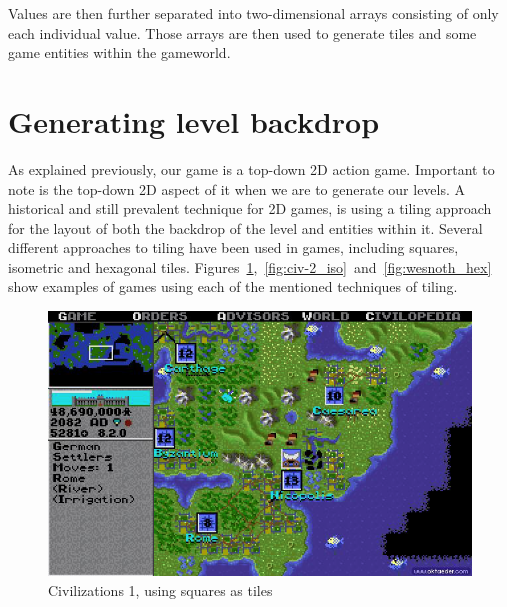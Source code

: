 Values are then further separated into two-dimensional arrays consisting of
only each individual value.  Those arrays are then used to generate tiles and
some game entities within the gameworld.

\section{Generating level backdrop}
As explained previously, our game is a top-down 2D action game. Important to
note is the top-down 2D aspect of it when we are to generate our levels.
A historical and still prevalent technique for 2D games, is using a
tiling approach for the layout of both the backdrop of the level and entities
within it. Several different approaches to tiling have been used in games,
including squares, isometric and hexagonal tiles.
Figures~\ref{fig:civ-1_square},~\ref{fig:civ-2_iso}~and~\ref{fig:wesnoth_hex}
show examples of games using each of the mentioned techniques of
tiling.

\begin{figure}[H]
    \centering
    \includegraphics[width=1\textwidth]{figures/generating_levels/civ-1_square.png}
    \caption{Civilizations 1, using squares as tiles}\label{fig:civ-1_square} 
\end{figure}

